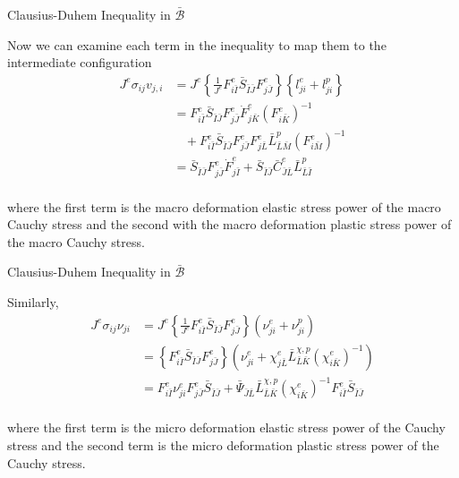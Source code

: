 \documentclass[11pt]{beamer}
\begin{document}
\begin{frame}{Clausius-Duhem Inequality in $\bar{\mathcal{B}}$}

Now we can examine each term in the inequality to map them to the intermediate configuration
\begin{align*}
J^e \sigma_{ij} v_{j,i} &= J^e \left\{\frac{1}{{J^e}}{F_{i\bar{I}}^e} \bar{S}_{\bar{I}\bar{J}} {F_{j\bar{J}}^e}\right\} \left\{ l_{ji}^e + l_{ji}^p\right\}\\
&= {F_{i\bar{I}}^e} \bar{S}_{\bar{I}\bar{J}} {F_{j\bar{J}}^e} \dot{F}_{j\bar{K}}^e \left(F_{i\bar{K}}^e\right)^{-1}\\
&\ \ \ \  + {F_{i\bar{I}}^e} \bar{S}_{\bar{I}\bar{J}} {F_{j\bar{J}}^e} F_{j\bar{L}}^e \bar{L}_{\bar{L}\bar{M}}^p \left(F_{i \bar{M}}^e\right)^{-1}\\
&= \bar{S}_{\bar{I}\bar{J}} {F_{j\bar{J}}^e} \dot{F}_{j\bar{I}}^e + \bar{S}_{\bar{I}\bar{J}} \bar{C}_{\bar{J}\bar{L}}^e\bar{L}_{\bar{L}\bar{I}}^p\\
\end{align*}

where the first term is the macro deformation elastic stress power of the macro Cauchy stress and the second with the macro deformation plastic stress power of the macro Cauchy stress.

\end{frame}

\begin{frame}{Clausius-Duhem Inequality in $\bar{\mathcal{B}}$}

Similarly,
\begin{align*}
J^e \sigma_{ij} \nu_{ji} &= J^e \left\{\frac{1}{{J^e}}{F_{i\bar{I}}^e} \bar{S}_{\bar{I}\bar{J}} {F_{j\bar{J}}^e}\right\} \left(\nu_{ji}^e + \nu_{ji}^p\right)\\
&= \left\{{F_{i\bar{I}}^e} \bar{S}_{\bar{I}\bar{J}} {F_{j\bar{J}}^e}\right\} \left(\nu_{ji}^e + \chi_{j\bar{L}}^e \bar{L}_{\bar{L}\bar{K}}^{\chi,p} \left(\chi_{i\bar{K}}^e\right)^{-1}\right)\\
&= F_{i\bar{I}}^e \nu_{ji}^e F_{j\bar{J}}^e \bar{S}_{\bar{I}\bar{J}} + \bar{\Psi}_{\bar{J}\bar{L}} \bar{L}_{\bar{L}\bar{K}}^{\chi,p} \left(\chi_{i\bar{K}}^e\right)^{-1} F_{i\bar{I}}^e \bar{S}_{\bar{I}\bar{J}}\\
\end{align*}

where the first term is the micro deformation elastic stress power of the Cauchy stress and the second term is the micro deformation plastic stress power of the Cauchy stress.

\end{frame}
\end{document}
